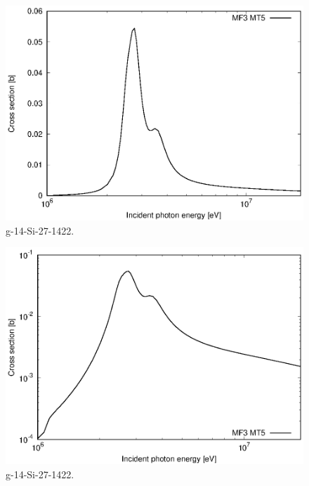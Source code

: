 \begin{figure}
 \includegraphics[width=\linewidth]{eps/g_14-Si-27_1422.eps}
  \caption{g-14-Si-27-1422.}
\end{figure}
\begin{figure}
 \includegraphics[width=\linewidth]{eps-log/g_14-Si-27_1422.eps}
 \caption{g-14-Si-27-1422.}
\end{figure}
\newpage \clearpage

